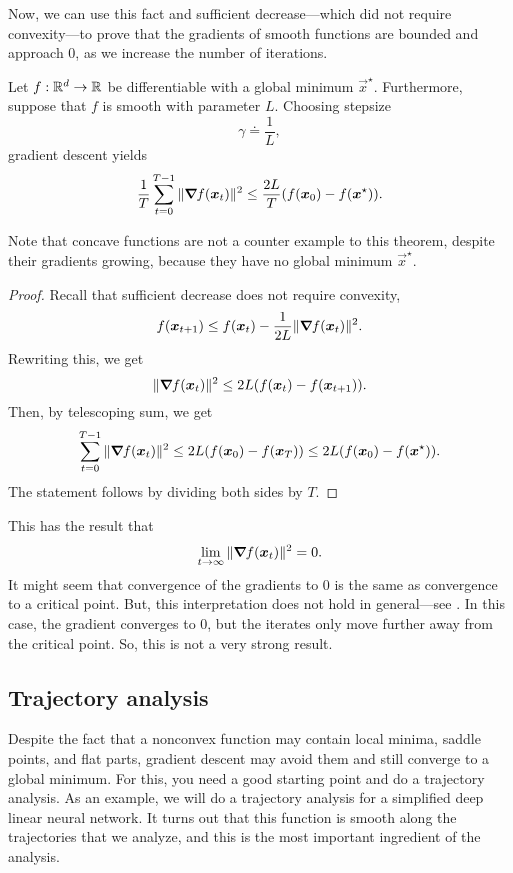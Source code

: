 Now, we can use this fact and sufficient decrease---which did not require convexity---to prove that
the gradients of smooth functions are bounded and approach 0, as we increase the number of
iterations.

\begin{theorem}
    Let $f: \mathbb{R}^d \to \mathbb{R}$ be differentiable with a global minimum $\vec{x}^\star$. Furthermore, suppose that $f$ is smooth with parameter $L$. Choosing stepsize \[
        \gamma \doteq \frac{1}{L},
    \]
    gradient descent yields \[
        \frac{1}{T} \sum_{t=0}^{T-1} \| \bm{\nabla}_{\! } f(\bm{x}_t) \|^2 \leq \frac{2L}{T} (f(\bm{x}_0) - f(\bm{x}^\star)).
    \]
\end{theorem}

\begin{remark}
    Note that concave functions are not a counter example to this theorem, despite their gradients
    growing, because they have no global minimum $\vec{x}^\star$.
\end{remark}

\begin{proof}
    Recall that sufficient decrease does not require convexity, \[
        f(\bm{x}_{t+1}) \leq f(\bm{x}_t) - \frac{1}{2L} \| \bm{\nabla}_{\! } f(\bm{x}_t) \|^2.
    \]
    Rewriting this, we get \[
        \| \bm{\nabla}_{\! } f(\bm{x}_t) \|^2 \leq 2L (f(\bm{x}_t) - f(\bm{x}_{t+1})).
    \]
    Then, by telescoping sum, we get \[
        \sum_{t=0}^{T-1} \| \bm{\nabla}_{\! } f(\bm{x}_t) \|^2 \leq 2L (f(\bm{x}_0) - f(\bm{x}_T)) \leq 2L (f(\bm{x}_0) - f(\bm{x}^\star)).
    \]
    The statement follows by dividing both sides by $T$.
\end{proof}

This has the result that \[
    \lim_{t \to \infty} \| \bm{\nabla}_{\! } f(\bm{x}_t) \|^2 = 0.
\]
It might seem that convergence of the gradients to 0 is the same as convergence to a critical
point. But, this interpretation does not hold in general---see . In
this case, the gradient converges to 0, but the iterates only move further away from the critical
point. So, this is not a very strong result.

\subsection{Trajectory analysis}

Despite the fact that a nonconvex function may contain local minima, saddle points, and flat parts,
gradient descent may avoid them and still converge to a global minimum. For this, you need a good
starting point and do a trajectory analysis. As an example, we will do a trajectory analysis for a
simplified deep linear neural network. It turns out that this function is smooth along the trajectories that we
analyze, and this is the most important ingredient of the analysis.

